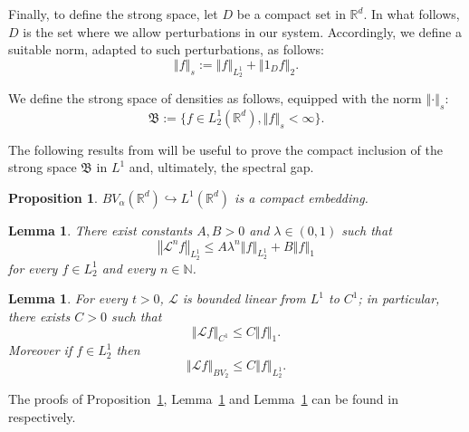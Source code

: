 \documentclass{amsart}
\newtheorem{lemma}[theorem]{Lemma}
\newtheorem{proposition}[theorem]{Proposition}
\newcommand\cL{{\mathcal L}}
\newcommand\bR{{\mathbb R}}
\newcommand\fB{{\mathfrak B}}
\newcommand{\norm}[1]{\left\Vert#1\right\Vert}
\begin{document}
Finally, to define the strong space, let $D$ be a compact set in $\mathbb{R}^{d}$. In what follows, \(D\) is the set where we allow perturbations in our system. Accordingly, we define a
suitable norm, adapted to such perturbations, as follows:
\begin{equation}\label{eq:strong_norm}
\norm{f}_{s}:=\norm{f}_{L_{2}^{1}}+\norm{1_{D}f}_{{2}}.
\end{equation}

We define the strong space of densities as follows, equipped with the norm $\norm{\cdot}_{s}$:
\begin{equation}\label{def:strongsp}
\fB:=\{f\in L_{2}^{1}\left( \bR^{d}\right) ,\norm{f}_{s}<\infty \}.
\end{equation}


The following results from \cite{FGGV24} will be useful to prove the compact inclusion of the strong space \(\fB\) in \(L^1\) and, ultimately, the spectral gap.
\begin{proposition}
\label{thm:embeddingRD} $BV_{\alpha }\left( \mathbb{R}^{d}\right)
\hookrightarrow L^{1}\left( \mathbb{R}^{d}\right) $ is a compact embedding.
\end{proposition}

\begin{lemma}
\label{lem:pbound} There exist constants $A,B>0$ and $\lambda \in \left(
0,1\right) $  such that 
\begin{equation}
\norm{\cL^{n}f}_{L_{2}^{1}}\leq A\lambda ^{n}\norm{f}_{L_{2}^{1}}+B\norm{f}_{{1}}
\label{ineq1 lemma 18}
\end{equation}%
for every $f\in L_{2}^{1}$ and every $n\in \mathbb{N}$.
\end{lemma}

\begin{lemma}
\label{lem:Rdregularization} For every $t>0$, $\cL$ is bounded linear from $%
L^{1}$ to $C^{1}$; in particular, there exists $C>0$ such that 
\begin{equation}
\norm{\cL f}_{C^{1}}\leq C\norm{f} _{{1}}.
\label{C1}
\end{equation}%
Moreover if $f\in L_{2}^{1}$ then 
\begin{equation}
\norm{ \cL f}_{BV_{2}}\leq C\norm{ f}_{L_{2}^{1}}.  \label{eq:RdstrongLY}
\end{equation}
\end{lemma}
The proofs of Proposition~\ref{thm:embeddingRD}, Lemma~\ref{lem:pbound} and Lemma~\ref{lem:Rdregularization} can be found in \cite[Theorem~16, Lemma~19 and Lemma~20]{FGGV24} respectively.\\
\end{document}
